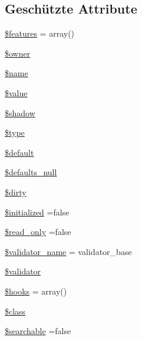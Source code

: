 \subsection*{Geschützte Attribute}
\begin{DoxyCompactItemize}
\item 
\hyperlink{classSunhill_1_1Properties_1_1oo__property_a48642aa3742885c6f12f9a0150af9638}{\$features} = array()
\item 
\hyperlink{classSunhill_1_1Properties_1_1oo__property_a8951668e1ff4d0b3b278e28e44654aaf}{\$owner}
\item 
\hyperlink{classSunhill_1_1Properties_1_1oo__property_a4b56189dc7ae025a582f5b327929d60c}{\$name}
\item 
\hyperlink{classSunhill_1_1Properties_1_1oo__property_ad3a5d6eb4dafbb196ee3caeef8f862c2}{\$value}
\item 
\hyperlink{classSunhill_1_1Properties_1_1oo__property_aadd8680aea82c13920cc143813dabb68}{\$shadow}
\item 
\hyperlink{classSunhill_1_1Properties_1_1oo__property_ad7cbc30948e1433d2b700010e7bb67cc}{\$type}
\item 
\hyperlink{classSunhill_1_1Properties_1_1oo__property_a0978e7d574caed62c6df9d514248d025}{\$default}
\item 
\hyperlink{classSunhill_1_1Properties_1_1oo__property_a4a9b13920c093bedd8b83aa649fae1ec}{\$defaults\+\_\+null}
\item 
\hyperlink{classSunhill_1_1Properties_1_1oo__property_a544c82579a711a34655696fed2f1415e}{\$dirty}
\item 
\hyperlink{classSunhill_1_1Properties_1_1oo__property_ac3c4b3310541ef41bfaff73421b2a1c9}{\$initialized} =false
\item 
\hyperlink{classSunhill_1_1Properties_1_1oo__property_a0a1fee24ef1c0be1a5878bf91a951dd8}{\$read\+\_\+only} =false
\item 
\hyperlink{classSunhill_1_1Properties_1_1oo__property_af76cd470c08b73d79e26c4b5c7db96bd}{\$validator\+\_\+name} = \textquotesingle{}validator\+\_\+base\textquotesingle{}
\item 
\hyperlink{classSunhill_1_1Properties_1_1oo__property_a8b5f5398b4666a794f512500b6f05a0c}{\$validator}
\item 
\hyperlink{classSunhill_1_1Properties_1_1oo__property_ac3b5d48496967ad6dc60366f8de689c7}{\$hooks} = array()
\item 
\hyperlink{classSunhill_1_1Properties_1_1oo__property_ad5b598597556a9a2e79cfc88bcdd32ee}{\$class}
\item 
\hyperlink{classSunhill_1_1Properties_1_1oo__property_aa74247349c277fc77104260410478e59}{\$searchable} =false
\end{DoxyCompactItemize}


